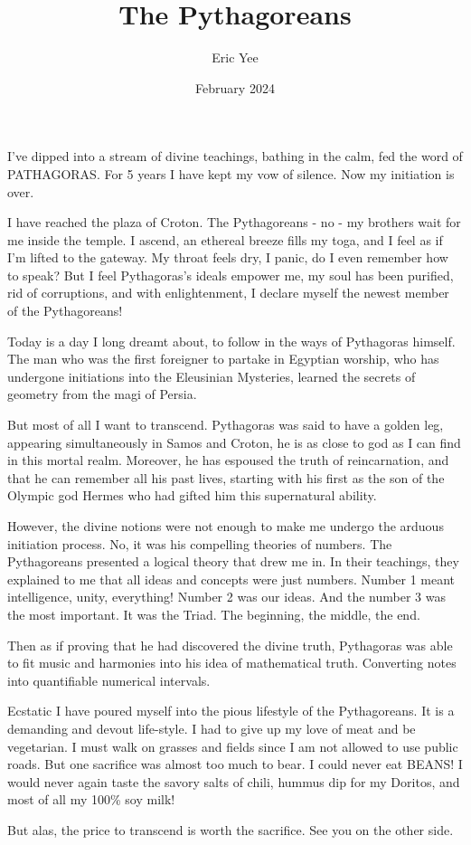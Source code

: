 \documentclass{article}
\title{The Pythagoreans}
\author{Eric Yee}
\date{February 2024}
\begin{document}
\maketitle

I've dipped into a stream of divine teachings, bathing in the calm, fed the word of PATHAGORAS. For 5 years I have kept my vow of silence. Now my initiation is over. 

I have reached the plaza of Croton. The Pythagoreans - no - my brothers wait for me inside the temple. I ascend, an ethereal breeze fills my toga, and I feel as if I'm lifted to the gateway. My throat feels dry, I panic, do I even remember how to speak? But I feel Pythagoras's ideals empower me, my soul has been purified, rid of corruptions, and with enlightenment, I declare myself the newest member of the Pythagoreans!

Today is a day I long dreamt about, to follow in the ways of Pythagoras himself. The man who was the first foreigner to partake in Egyptian worship, who has undergone initiations into the Eleusinian Mysteries, learned the secrets of geometry from the magi of Persia.

But most of all I want to transcend. Pythagoras was said to have a golden leg, appearing simultaneously in Samos and Croton, he is as close to god as I can find in this mortal realm. Moreover, he has espoused the truth of reincarnation, and that he can remember all his past lives, starting with his first as the son of the Olympic god Hermes who had gifted him this supernatural ability. 

However, the divine notions were not enough to make me undergo the arduous initiation process. No, it was his compelling theories of numbers. The Pythagoreans presented a logical theory that drew me in. In their teachings, they explained to me that all ideas and concepts were just numbers. Number 1 meant intelligence, unity, everything! Number 2 was our ideas. And the number 3 was the most important. It was the Triad. The beginning, the middle, the end.

Then as if proving that he had discovered the divine truth, Pythagoras was able to fit music and harmonies into his idea of mathematical truth. Converting notes into quantifiable numerical intervals.

Ecstatic I have poured myself into the pious lifestyle of the Pythagoreans. It is a demanding and devout life-style. I had to give up my love of meat and be vegetarian. I must walk on grasses and fields since I am not allowed to use public roads. But one sacrifice was almost too much to bear. I could never eat BEANS! I would never again taste the savory salts of chili, hummus dip for my Doritos, and most of all my 100\% soy milk!

But alas, the price to transcend is worth the sacrifice. See you on the other side.
\end{document}
